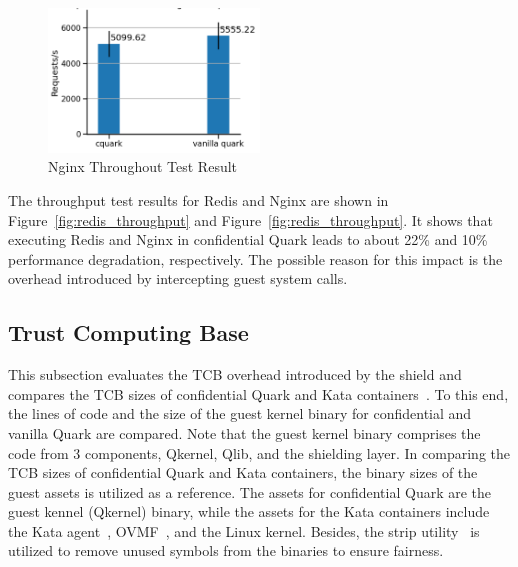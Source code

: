 \begin{figure}[!htb]
  \centering
  \includegraphics[width=0.5\textwidth]{images/nginx_throughput.PNG}
  \caption[Nginx Throughout Test]{Nginx Throughout Test Result}
  \label{fig:nginx_throughput}
\end{figure}

The throughput test results for Redis and Nginx are shown in Figure~\ref{fig:redis_throughput} and Figure~\ref{fig:redis_throughput}. It shows that executing Redis and Nginx in confidential Quark leads to about 22\% and 10\% performance degradation, respectively. 
The possible reason for this impact is the overhead introduced by intercepting guest system calls.


\subsection{Trust Computing Base}\label{tcb}

This subsection evaluates the \acrshort{TCB} overhead introduced by the shield and compares the \acrshort{TCB}  sizes of confidential Quark and Kata containers~\cite*{Kata-Containers}. To this end, the lines of code and the size of the guest kernel binary for confidential and 
vanilla Quark are compared. Note that the guest kernel binary comprises the code from 3 components, Qkernel, Qlib, and the shielding layer. In comparing the \acrshort{TCB} sizes of confidential Quark and Kata containers, the binary sizes of the guest assets is utilized as a reference. The assets for 
confidential Quark are the guest kennel (Qkernel) binary, while the assets for the Kata containers include the Kata agent~\cite*{kata_agent}, OVMF~\cite*{ovmf}, and the Linux kernel. Besides, the strip utility~\cite*{strip} is utilized to remove unused symbols from the binaries to ensure fairness.

